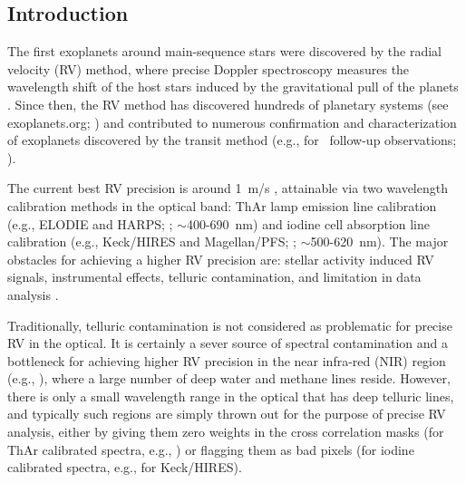 \subsection{Introduction}\label{keck:telluric:intro}

The first exoplanets around main-sequence stars were discovered by the
radial velocity (RV) method, where precise Doppler spectroscopy
measures the wavelength shift of the host stars induced by the
gravitational pull of the planets \citep{1988ApJ...331..902C,
  1989Natur.339...38L, 1993ApJ...413..339H, 1995Natur.378..355M,
  1996ApJ...464L.153B}. Since then, the RV method has discovered
hundreds of planetary systems (see exoplanets.org; \citealt{eod2014})
and contributed to numerous confirmation and characterization of
exoplanets discovered by the transit method (e.g., for
\kepler\ follow-up observations; \citealt{Marcy2014}).

The current best RV precision is around 1~m/s \citep{eprv2015},
attainable via two wavelength calibration methods in the optical band:
ThAr lamp emission line calibration (e.g., ELODIE and HARPS;
\citealt{elodie, harps-s}; $\sim$400-690~nm) and iodine cell
absorption line calibration (e.g., Keck/HIRES and Magellan/PFS;
\citealt{butler1996, 2010SPIE.7735E..53C}; $\sim$500-620~nm). The
major obstacles for achieving a higher RV precision are: stellar
activity induced RV signals, instrumental effects, telluric
contamination, and limitation in data analysis \citep{eprv2015}.

Traditionally, telluric contamination is not considered as problematic
for precise RV in the optical. It is certainly a sever source of
spectral contamination and a bottleneck for achieving higher RV
precision in the near infra-red (NIR) region (e.g.,
\citealt{2010ApJ...713..410B}), where a large number of deep water and
methane lines reside. However, there is only a small wavelength
range in the optical that has deep telluric lines, and typically such
regions are simply thrown out for the purpose of precise RV analysis,
either by giving them zero weights in the cross correlation masks (for
ThAr calibrated spectra, e.g., \citealt{2002A&A...388..632P}) or
flagging them as bad pixels (for iodine calibrated spectra, e.g., for
Keck/HIRES).

